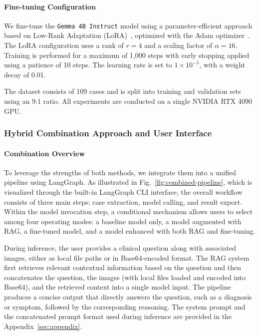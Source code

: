 \paragraph{Fine-tuning Configuration}
We fine-tune the \texttt{Gemma 4B Instruct} model using a parameter-efficient approach based on Low-Rank Adaptation (LoRA)~\cite{lora}, optimized with the Adam optimizer~\cite{adam}. The LoRA configuration uses a rank of $r=4$ and a scaling factor of $\alpha=16$. Training is performed for a maximum of 1,000 steps with early stopping applied using a patience of 10 steps. The learning rate is set to $1\times10^{-5}$, with a weight decay of 0.01.

The dataset consists of 109 cases and is split into training and validation sets using an 9:1 ratio. All experiments are conducted on a single NVIDIA RTX 4090 GPU.

\subsubsection{Hybrid Combination Approach and User Interface}
\label{sec:hybrid-approach}

\paragraph{Combination Overview}

To leverage the strengths of both methods, we integrate them into a unified pipeline using LangGraph. As illustrated in Fig.~\ref{fig:combined-pipeline}, which is visualized through the built-in LangGraph CLI interface, the overall workflow consists of three main steps: case extraction, model calling, and result export. Within the model invocation step, a conditional mechanism allows users to select among four operating modes: a baseline model only, a model augmented with \ac{RAG}, a fine-tuned model, and a model enhanced with both \ac{RAG} and fine-tuning.

During inference, the user provides a clinical question along with associated images, either as local file paths or in Base64-encoded format. The \ac{RAG} system first retrieves relevant contextual information based on the question and then concatenates the question, the images (with local files loaded and encoded into Base64), and the retrieved context into a single model input. The pipeline produces a concise output that directly answers the question, such as a diagnosis or symptom, followed by the corresponding reasoning. The system prompt and the concatenated prompt format used during inference are provided in the Appendix~\ref{sec:appendix}.

